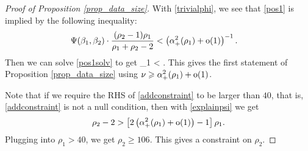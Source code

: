 \begin{proof}[Proof of Proposition \ref{prop_data_size}]
%

 With \eqref{trivialphi}, we see that \eqref{pos1} is implied by the following inequality:
\begin{align}\label{pos1solv}
 &  \Psi(\beta_1,\beta_2) \cdot \frac{(\rho_2-1) \rho_1 }{\rho_1+\rho_2-2}   < \left( \alpha_+^2(\rho_1) +  \operatorname{o}(1) \right)^{-1} .
 \end{align}
 Then we can solve \eqref{pos1solv} to get
 \be\label{addconstraint}\rho_1 <   .\ee
 This gives the first statement of Proposition \ref{prop_data_size} using $\nu\geqslant \alpha_+^2(\rho_1) +  \operatorname{o}(1) $. %
 
 
 Note that if we require the RHS of \eqref{addconstraint} to be larger than $40$, that is, \eqref{addconstraint} is not a null condition, then with \eqref{explainpsi} we get
 $$ \rho_2 - 2>\left[ 2\left( \alpha_+^2(\rho_1) +  \operatorname{o}(1) \right)  -1\right]\rho_1 .$$
Plugging into $\rho_1>40$, we get $\rho_2 \ge 106$. This gives a constraint on $\rho_2$. 
 

\vspace{5pt}


\end{proof}
